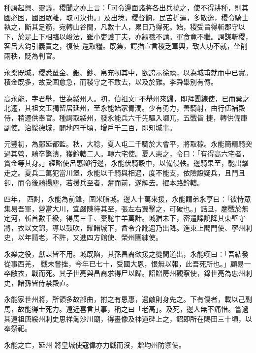 \begin{pinyinscope}
 種諤起興、靈議，稷聞之亦上言：「可令邊面諸將各出兵撓之，使不得耕種，則其國必困，國困眾離，取可決也。」及出境，稷督餉，民苦折運，多散逸，稷令騎士執之，斷其足筋，宛轉山谷間，凡數十人，累日乃得死。始，稷受旨得斬郡守以下，於是上下相臨以峻法，雖小吏護丁夫，亦顓戮不請。軍食竟不繼。諤謀斬稷，客呂大鈞引義責之，復使
 還取糧。既集，諤猶宣言稷乏軍興，致大功不就，坐削兩秩，貶為判官。



 永樂既城，稷悉輦金、銀、鈔、帛充牣其中，欲誇示徐禧，以為城甫就而中已實。積金既多，故受圍愈急，而稷守之不敢去，以及於難。李舜舉別有傳。



 高永能，字君舉，世為綏州人。初，伯祖文□不舉州來歸，即拜團練使，已而棄之北遷，其祖文玉獨留居延州，至永能始家青澗。少有勇力，善騎射，由行伍補殿侍，稍遷供奉官。種諤取綏州，發永能兵六千先驅入囉兀，五戰皆
 捷，轉供備庫副使。治綏德城，闢地四千頃，增戶千三百，即知城事。



 元豐初，為鄜延都監。秋，大稔，夏人屯二千騎於大會平，將取稼。永能簡精騎突過其營，騎卒驚潰，獲鈐轄二人。轉六宅使。夏人患之，令曰：「有得高六宅者，賞金等其身。」經略使呂惠卿行邊，永能伏騎穀中，以備侵軼。邊騎果至，馳出擊走之。夏兵二萬犯當川堡，永能以千騎與相遇，度不能支，依險設疑兵，且鬥且卻，而令後騎揚塵，若援兵至者，奮而前，遂解去。擢本路鈐轄。



 四年，
 西討，永能為前鋒，圍米脂城。邊人十萬來援，永能謂弟永亨曰：「彼恃眾集易吾軍，營當大川，宜嚴陳待其至，張左右翼擊之，可破也。」詰旦，鏖戰於無定河，斬首數千級，得馬三千、橐駝牛羊萬計。城猶未下，密遣諜說降其東壁守將，衣以文錦，導以鼓吹，耀諸城下，酋令介訛遇乃出降。進東上閣門使、寧州刺史，以年請老，不許，又進四方館使、榮州團練使。



 永樂之役，獻謀皆不用。城既陷，其孫昌裔欲援之從間道出，永能嘆曰：「吾結發從事西羌，
 戰未嘗挫，今年已七十，受國大恩，恨無以報，此吾死所也。」顧易一卒敝衣，戰而死。其子世亮與昌裔求得尸以歸。詔贈房州觀察使，錄世亮為忠州刺史，諸孫皆侍禁殿直。



 永能家世州將，所領多故部曲，拊之有恩惠，遇敵則身先之。下有傷者，載以己副馬，故能得士死力。遠近喜言其事，稱之曰「老高」。及死，邊人無不痛惜。嘗過其遠祖唐綏州刺史思祥淘沙川廟，得畫像及神道碑上之，詔即所在賜田三十頃，以奉祭祀。



 永能之亡，延州
 將皇城使寇偉亦力戰而沒，贈均州防禦使。




\end{pinyinscope}
